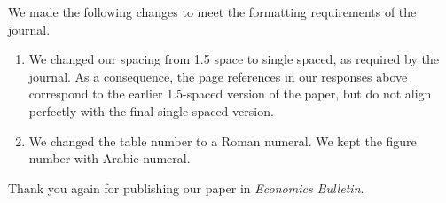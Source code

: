 \documentclass[english,authoryear,12pt]{elsarticle}
\begin{document}
We made the following changes to meet the formatting requirements of the journal.

\begin{enumerate}
  \item We changed our spacing from 1.5 space to single spaced, as required by the journal. As a consequence, the page references in our responses above correspond to the earlier 1.5-spaced version of the paper, but do not align perfectly with the final single-spaced version.
  \item We changed the table number to a Roman numeral. We kept the figure number with Arabic numeral.
\end{enumerate}

Thank you again for publishing our paper in \textit{Economics Bulletin}.
\end{document}
